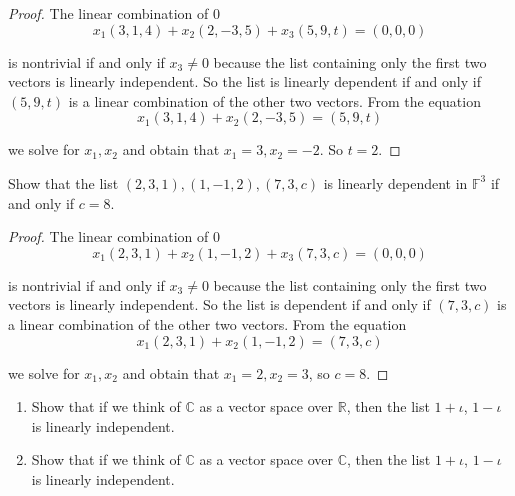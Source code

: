 \begin{proof}
    The linear combination of $0$
    \[
        x_{1}(3, 1, 4) + x_{2}(2, -3, 5) + x_{3}(5, 9, t) = (0, 0, 0)
    \]

    is nontrivial if and only if $x_{3}\ne 0$ because the list containing only the first two vectors is linearly independent. So the list is linearly dependent if and only if $(5, 9, t)$ is a linear combination of the other two vectors. From the equation
    \[
        x_{1}(3, 1, 4) + x_{2}(2, -3, 5) = (5, 9, t)
    \]

    we solve for $x_{1}, x_{2}$ and obtain that $x_{1} = 3, x_{2} = -2$. So $t = 2$.
\end{proof}

\begin{exercise}
    Show that the list $(2, 3, 1), (1, -1, 2), (7, 3, c)$ is linearly dependent in $\mathbb{F}^{3}$ if and only if $c = 8$.
\end{exercise}

\begin{proof}
    The linear combination of $0$
    \[
        x_{1}(2, 3, 1) + x_{2}(1, -1, 2) + x_{3}(7, 3, c) = (0, 0, 0)
    \]

    is nontrivial if and only if $x_{3}\ne 0$ because the list containing only the first two vectors is linearly independent. So the list is dependent if and only if $(7, 3, c)$ is a linear combination of the other two vectors. From the equation
    \[
        x_{1}(2, 3, 1) + x_{2}(1, -1, 2) = (7, 3, c)
    \]

    we solve for $x_{1}, x_{2}$ and obtain that $x_{1} = 2, x_{2} = 3$, so $c = 8$.
\end{proof}

\begin{exercise}
    \begin{enumerate}[label={(\alph*)}]
        \item Show that if we think of $\mathbb{C}$ as a vector space over $\mathbb{R}$, then the list $1 + \iota$, $1 - \iota$ is linearly independent.
        \item Show that if we think of $\mathbb{C}$ as a vector space over $\mathbb{C}$, then the list $1 + \iota$, $1 - \iota$ is linearly independent.
    \end{enumerate}
\end{exercise}

